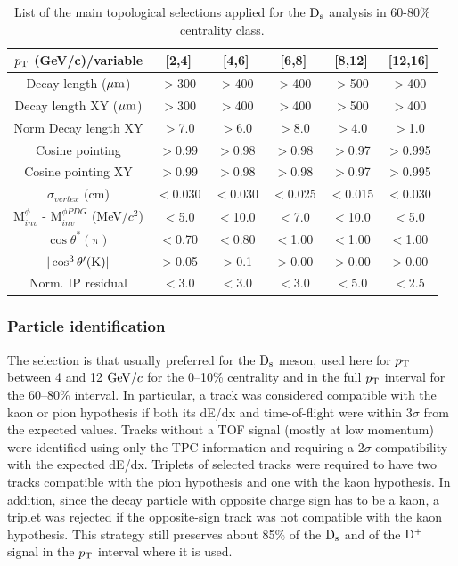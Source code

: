 \begin{table}[!h]
 \caption{List of the main topological selections applied for the
   ${\rm D_s}$ analysis in 60-80\% centrality class.}
 \label{topologicalselections_ds_6080}
 \begin{center}
  \begin{tabular}{|c|c|c|c|c|c|}
\hline
$p_{\rm T}$ (GeV/c)/variable & [2,4] & [4,6] & [6,8] & [8,12] & [12,16] \\
\hline
\hline
Decay length ($\mathrm{\mu m}$)                 & $>$300 & $>$400 & $>$400 & $>$500 & $>$400\\
\hline
Decay length XY ($\mathrm{\mu m}$)            & $>$300 & $>$400 & $>$400 & $>$500 & $>$400\\
\hline
Norm Decay length XY                   & $>$7.0& $>$6.0 & $>$8.0 & $>$4.0 & $>$1.0\\
\hline
Cosine pointing                               & $>$0.99 & $>$0.98 & $>$0.98 & $>$0.97 & $>$0.995\\
\hline
Cosine pointing XY                          & $>$0.99 & $>$0.98 & $>$0.98 & $>$0.97 & $>$0.995\\
\hline
$\sigma_{vertex}$  (cm)                   & $<$0.030 & $<$0.030 & $<$0.025 & $<$0.015 & $<$0.030\\
\hline
M$^{\phi}_{inv}$ - M$^{\phi PDG}_{inv}$ (MeV/$c^{2}$) & $<$5.0 & $<$10.0 & $<$7.0 & $<$10.0 & $<$5.0\\
\hline
$\cos \theta^*(\pi)$                             & $<$0.70 & $<$0.80 & $<$1.00 & $<$1.00 & $<$1.00\\
\hline
$|\cos^3 \theta^\prime({\rm K})|$        & $>$0.05 & $>$0.1 & $>$0.00 & $>$0.00 & $>$0.00\\
\hline
Norm. IP residual                               & $<$3.0 & $<$3.0 & $<$3.0 & $<$5.0 & $<$2.5 \\[1ex]
\hline
  \end{tabular}
 \end{center}
\end{table}
\subsubsection{Particle identification}

 The selection is that usually preferred for the ${\rm D_s}$ meson, used here for $p_{\rm T}$ between 4 and 12 $\mathrm{GeV}/c$ for the 0--10\% centrality and in the
full $p_{\rm T}$ interval for the 60--80\% interval. In particular, a track was considered compatible with the kaon or pion hypothesis if both its dE/dx and time-of-flight were within 3$\sigma$ from the expected values. 
Tracks without a TOF signal (mostly at low momentum) were identified using only the TPC information and requiring a 2$\sigma$ compatibility with the expected dE/dx. Triplets of selected tracks were required to have two tracks compatible with the pion hypothesis and one with the kaon hypothesis. In addition, since the decay particle with opposite charge sign has to be a kaon, a triplet was rejected if the opposite-sign track was not compatible with the kaon hypothesis. This strategy still preserves about 85$\%$ of the ${\rm D_s}$ and of the ${\rm D^+}$ signal in the $p_{\rm T}$ interval where it is used.
